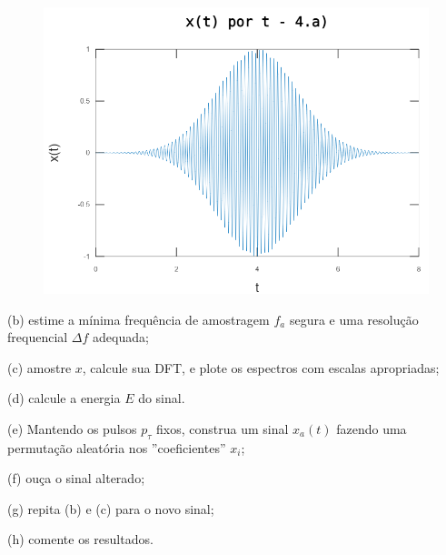 \documentclass[10pt]{article}
\begin{document}
\begin{figure}[h]
    \includegraphics[scale=0.6]{questao4a}
    \centering
\end{figure}

(b) estime a mínima frequência de amostragem $f_a$ segura e uma resolução frequencial $\Delta f$ adequada;

(c) amostre $x$, calcule sua DFT, e plote os espectros com escalas apropriadas;

(d) calcule a energia $E$ do sinal.

(e) Mantendo os pulsos $p_{\tau}$ fixos, construa um sinal $x_a(t)$ fazendo uma permutação aleatória nos ''coeficientes'' $x_i$;

(f) ouça o sinal alterado;

(g) repita (b) e (c) para o novo sinal;

(h) comente os resultados.
\end{document}
